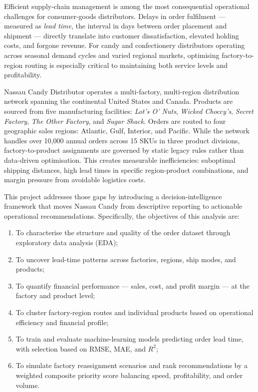 \documentclass[12pt, a4paper]{article}
\begin{document}
Efficient supply-chain management is among the most consequential operational
challenges for consumer-goods distributors. Delays in order fulfilment --- measured
as \emph{lead time}, the interval in days between order placement and shipment ---
directly translate into customer dissatisfaction, elevated holding costs, and
forgone revenue. For candy and confectionery distributors operating across
seasonal demand cycles and varied regional markets, optimising factory-to-region
routing is especially critical to maintaining both service levels and profitability.

Nassau Candy Distributor operates a multi-factory, multi-region distribution
network spanning the continental United States and Canada. Products are sourced
from five manufacturing facilities: \emph{Lot's O' Nuts}, \emph{Wicked Choccy's},
\emph{Secret Factory}, \emph{The Other Factory}, and \emph{Sugar Shack}. Orders
are routed to four geographic sales regions: Atlantic, Gulf, Interior, and Pacific.
While the network handles over 10,000 annual orders across 15 SKUs in three
product divisions, factory-to-product assignments are governed by static legacy
rules rather than data-driven optimisation. This creates measurable inefficiencies:
suboptimal shipping distances, high lead times in specific region-product
combinations, and margin pressure from avoidable logistics costs.

This project addresses those gaps by introducing a decision-intelligence framework
that moves Nassau Candy from descriptive reporting to actionable operational
recommendations. Specifically, the objectives of this analysis are:

\begin{enumerate}[leftmargin=*, label=\roman*.]
    \item To characterise the structure and quality of the order dataset through
          exploratory data analysis (EDA);
    \item To uncover lead-time patterns across factories, regions, ship modes,
          and products;
    \item To quantify financial performance --- sales, cost, and profit margin ---
          at the factory and product level;
    \item To cluster factory-region routes and individual products based on
          operational efficiency and financial profile;
    \item To train and evaluate machine-learning models predicting order lead
          time, with selection based on RMSE, MAE, and $R^2$;
    \item To simulate factory reassignment scenarios and rank recommendations
          by a weighted composite priority score balancing speed, profitability,
          and order volume.
\end{enumerate}
\end{document}
